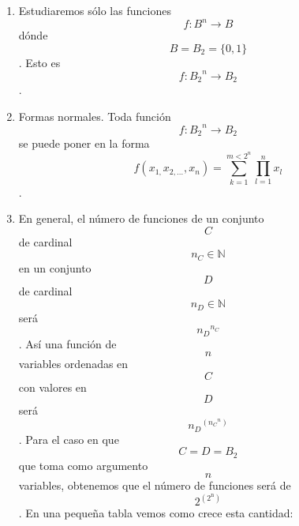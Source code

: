 \documentclass[
]{article}
\providecommand{\tightlist}{%
  \setlength{\itemsep}{0pt}\setlength{\parskip}{0pt}}
\begin{document}
\begin{enumerate}
\begin{enumerate}
    \begin{enumerate}
    \def\labelenumiii{\arabic{enumiii}.}
    \tightlist
    \item
      Estudiaremos sólo las funciones \[f:{B^{n}\rightarrow B}\] dónde
      \[{B = B_{2}} = {\{ 0,1\}}\]. Esto es
      \[f:{{B_{2}}^{n}\rightarrow B_{2}}\].
    \item
      Formas normales. Toda función \[f:{{B_{2}}^{n}\rightarrow B_{2}}\]
      se puede poner en la forma
      \[f{{({x_{1,}x_{2,...},x_{n}})} = {\sum\limits_{k = 1}^{m < 2^{n}}{\prod\limits_{l = 1}^{n}x_{l}}}}\].
    \item
      En general, el número de funciones de un conjunto \[C\]de cardinal
      \[n_{C} \in \mathbb{N}\] en un conjunto \[D\]de cardinal
      \[n_{D} \in \mathbb{N}\]será \[{n_{D}}^{n_{C}}\]. Así una función
      de \[n\] variables ordenadas en \[C\]con valores en \[D\]será
      \[{n_{D}}^{({n_{C}}^{n})}\]. Para el caso en que
      \[{C = D} = B_{2}\]que toma como argumento\[n\] variables,
      obtenemos que el número de funciones será de
      \[2^{(2^{\mathbf{\mathrm{n}}})}\]. En una pequeña tabla vemos como
      crece esta cantidad:
    \end{enumerate}
  \end{enumerate}
\end{enumerate}
\end{document}
